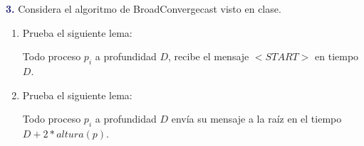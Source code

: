 \newpage
\textbf{\textcolor{MidnightBlue}{3.}}
Considera el algoritmo de BroadConvergecast visto en clase.
\begin{enumerate}
\item Prueba el siguiente lema:
      
      \guillemotleft Todo proceso $p_i$ a profundidad
      $D$, recibe el mensaje $<START>$ en tiempo $D$\guillemotright.
\item Prueba el siguiente lema:
      
      \guillemotleft Todo proceso $p_i$ a profundidad $D$
      envía su mensaje a la raíz en el tiempo $D+2*altura(p)$\guillemotright.
\end{enumerate} 
